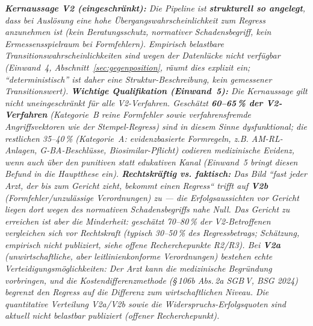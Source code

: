 \documentclass{umbruch-position}
\begin{document}
\smallskip
\noindent\textit{\textbf{Kernaussage V2 (eingeschränkt):} Die Pipeline ist \textbf{strukturell so angelegt}, dass bei Auslösung eine hohe Übergangs\-wahrscheinlichkeit zum Regress anzunehmen ist (kein Beratungs\-schutz, normativer Schadensbegriff, kein Ermessensspielraum bei Formfehlern). Empirisch belastbare Transitions\-wahrscheinlichkeiten sind wegen der Daten\-lücke nicht verfügbar (Einwand~4, Abschnitt~\ref{sec:gegenposition}, räumt dies explizit ein; ``deterministisch'' ist daher eine Struktur-Beschreibung, kein gemessener Transitions\-wert). \textbf{Wichtige Qualifikation (Einwand~5):} Die Kernaussage gilt nicht uneingeschränkt für alle V2-Verfahren. Geschätzt \textbf{60--65\,\% der V2-Verfahren} (Kategorie~B reine Formfehler sowie verfahrens\-fremde Angriffs\-vektoren wie der Stempel-Regress) sind in diesem Sinne \emph{dysfunktional}; die restlichen 35--40\,\% (Kategorie~A: evidenz\-basierte Formregeln, z.B. AM-RL-Anlagen, G-BA-Beschlüsse, Biosimilar-Pflicht) codieren medizinische Evidenz, wenn auch über den punitiven statt edukativen Kanal (Einwand~5 bringt diesen Befund in die Hauptthese ein). \textbf{Rechtskräftig vs. faktisch:} Das Bild ``fast jeder Arzt, der bis zum Gericht zieht, bekommt einen Regress`` trifft auf \textbf{V2b} (Formfehler/unzulässige Verordnungen) zu --- die Erfolgsaussichten vor Gericht liegen dort wegen des normativen Schadensbegriffs nahe Null. Das Gericht zu erreichen ist aber die \emph{Minderheit}: geschätzt 70--80\,\% der V2-Betroffenen vergleichen sich vor Rechtskraft (typisch 30--50\,\% des Regressbetrags; Schätzung, empirisch nicht publiziert, siehe offene Recherchepunkte R2/R3). Bei \textbf{V2a} (unwirtschaftliche, aber leitlinienkonforme Verordnungen) bestehen echte Verteidigungsmöglichkeiten: Der Arzt kann die medizinische Begründung vorbringen, und die Kostendifferenzmethode (\S\,106b Abs.\,2a SGB\,V, BSG 2024) begrenzt den Regress auf die Differenz zum wirtschaftlichen Niveau. Die quantitative Verteilung V2a/V2b sowie die Widerspruchs-Erfolgsquoten sind aktuell nicht belastbar publiziert (offener Recherchepunkt).}

\end{document}
